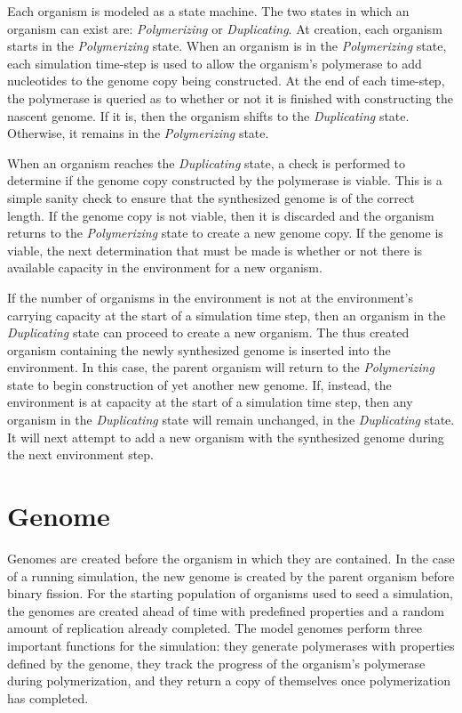 Each organism is modeled as a state machine. The two states in which an organism can exist are: \emph{Polymerizing} or \emph{Duplicating}. At creation, each organism starts in the \emph{Polymerizing} state. When an organism is in the \emph{Polymerizing} state, each simulation time-step is used to allow the organism's polymerase to add nucleotides to the genome copy being constructed. At the end of each time-step, the polymerase is queried as to whether or not it is finished with constructing the nascent genome. If it is, then the organism shifts to the \emph{Duplicating} state. Otherwise, it remains in the \emph{Polymerizing} state.

When an organism reaches the \emph{Duplicating} state, a check is performed to determine if the genome copy constructed by the polymerase is viable. This is a simple sanity check to ensure that the synthesized genome is of the correct length. If the genome copy is not viable, then it is discarded and the organism returns to the \emph{Polymerizing} state to create a new genome copy. If the genome is viable, the next determination that must be made is whether or not there is available capacity in the environment for a new organism.

If the number of organisms in the environment is not at the environment's carrying capacity at the start of a simulation time step, then an organism in the \emph{Duplicating} state can proceed to create a new organism. The thus created organism containing the newly synthesized genome is inserted into the environment. In this case, the parent organism will return to the \emph{Polymerizing} state to begin construction of yet another new genome. If, instead, the environment is at capacity at the start of a simulation time step, then any organism in the \emph{Duplicating} state will remain unchanged, in the \emph{Duplicating} state. It will next attempt to add a new organism with the synthesized genome during the next environment step.

\section*{Genome} %
\label{sec:genome}
Genomes are created before the organism in which they are contained. In the case of a running simulation, the new genome is created by the parent organism before binary fission. For the starting population of organisms used to seed a simulation, the genomes are created ahead of time with predefined properties and a random amount of replication already completed. The model genomes perform three important functions for the simulation: they generate polymerases with properties defined by the genome, they track the progress of the organism's polymerase during polymerization, and they return a copy of themselves once polymerization has completed.

